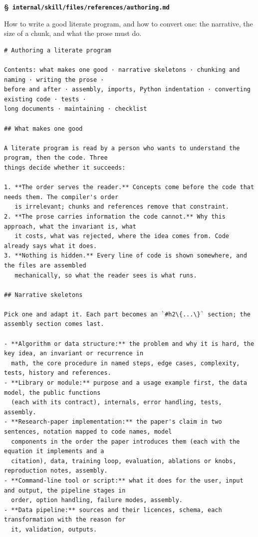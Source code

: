 \documentclass[10pt,a4paper]{article}
\newcounter{chunk}
\renewcommand{\thechunk}{\S\arabic{chunk}}
\newcommand{\chunkhead}[2]{\par\addvspace{1.2ex}\noindent\refstepcounter{chunk}\label{#1}{\bfseries\thechunk}\enspace #2\par\nopagebreak}
\newcommand{\filebadge}{{\footnotesize\itshape\color{tuftegray}file}}
\begin{document}
\chunkhead{chunk282}{\filebadge\ \textbf{\texttt{internal/\allowbreak{}skill/\allowbreak{}files/\allowbreak{}references/\allowbreak{}authoring.\allowbreak{}md}}}
How to write a good literate program, and how to convert one: the narrative, the size of a chunk, and what the prose must do.
\begin{Verbatim}
# Authoring a literate program

Contents: what makes one good · narrative skeletons · chunking and naming · writing the prose ·
before and after · assembly, imports, Python indentation · converting existing code · tests ·
long documents · maintaining · checklist

## What makes one good

A literate program is read by a person who wants to understand the program, then the code. Three
things decide whether it succeeds:

1. **The order serves the reader.** Concepts come before the code that needs them. The compiler's order
   is irrelevant; chunks and references remove that constraint.
2. **The prose carries information the code cannot.** Why this approach, what the invariant is, what
   it costs, what was rejected, where the idea comes from. Code already says what it does.
3. **Nothing is hidden.** Every line of code is shown somewhere, and the files are assembled
   mechanically, so what the reader sees is what runs.

## Narrative skeletons

Pick one and adapt it. Each part becomes an `#h2\{...\}` section; the assembly section comes last.

- **Algorithm or data structure:** the problem and why it is hard, the key idea, an invariant or recurrence in
  math, the core procedure in named steps, edge cases, complexity, tests, history and references.
- **Library or module:** purpose and a usage example first, the data model, the public functions
  (each with its contract), internals, error handling, tests, assembly.
- **Research-paper implementation:** the paper's claim in two sentences, notation mapped to code names, model
  components in the order the paper introduces them (each with the equation it implements and a
  citation), data, training loop, evaluation, ablations or knobs, reproduction notes, assembly.
- **Command-line tool or script:** what it does for the user, input and output, the pipeline stages in
  order, option handling, failure modes, assembly.
- **Data pipeline:** sources and their licences, schema, each transformation with the reason for
  it, validation, outputs.


\end{Verbatim}
\end{document}
